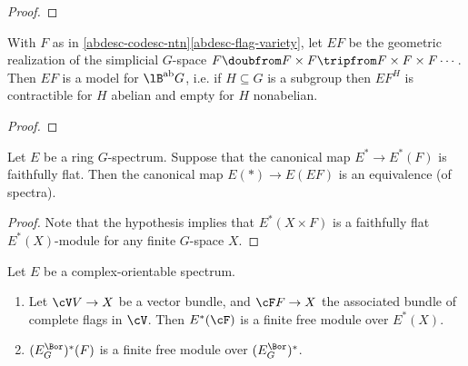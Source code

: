 \begin{proof}
  
\end{proof}

\begin{lemma}
  \label{abdesc-BabG-construction}
  With $F$ as in \cref{abdesc-codesc-ntn}\cref{abdesc-flag-variety},
  let $EF$ be the geometric realization of the simplicial $G$-space
  $F \doubfrom F \times F \tripfrom F \times F \times F \cdots$. Then
  $EF$ is a model for $\lB^\ab G$, i.e. if $H \subseteq G$ is a
  subgroup then $EF^H$ is contractible for $H$ abelian and empty for
  $H$ nonabelian.
\end{lemma}

\begin{proof}
  
\end{proof}

\begin{lemma}
  \label{abdesc-flag-faithflat}
  Let $E$ be a ring $G$-spectrum. Suppose that the canonical map
  $E^* \to E^*(F)$ is faithfully flat. Then the canonical map
  $E(*) \to E(EF)$ is an equivalence (of spectra).
\end{lemma}

\begin{proof}
  Note that the hypothesis implies that $E^*(X \times F)$ is a
  faithfully flat $E^*(X)$-module for any finite $G$-space $X$.
\end{proof}


\begin{lemma}
  \label{abdesc-co-flag-faithflat}
  Let $E$ be a complex-orientable spectrum.
  \begin{enumerate}
  \item \label{abdesc-co-flag-bundle} Let $\cV V \to X$ be a vector
    bundle, and $\cF F \to X$ the associated bundle of complete flags in
    $\cV$. Then $E^*(\cF)$ is a finite free module over $E^*(X)$.
  \item \label{abdesc-co-flag-interest} $(E^{\Bor}_G)^*(F)$ is a
    finite free module over $(E^\Bor_G)^*$.
  \end{enumerate}
\end{lemma}

